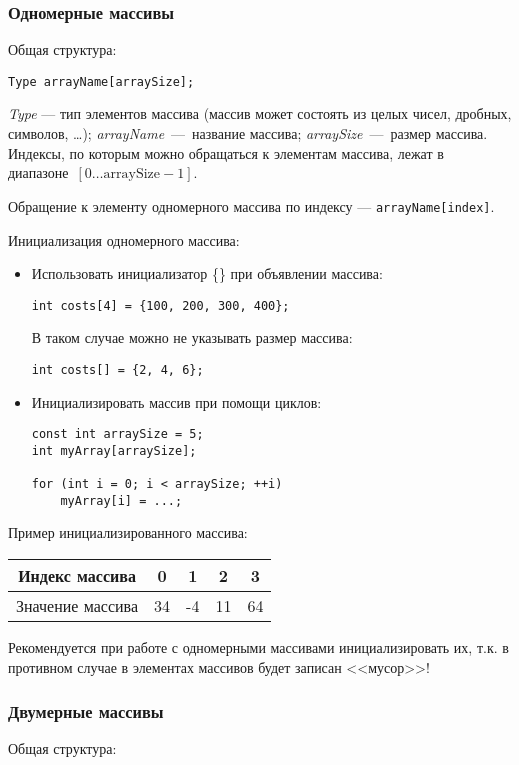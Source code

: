 \subsubsection{Одномерные массивы}
Общая структура:

\lstinline|Type arrayName[arraySize];|

\textit{Type} --- тип элементов массива
(массив может состоять из целых чисел, дробных, символов, \ldots);
\textit{arrayName}~---~название массива; \textit{arraySize}~---~размер
массива. Индексы, по которым можно обращаться к элементам массива,
лежат в диапазоне~$\left[ 0 \ldots \text{arraySize} - 1 \right]$.

Обращение к элементу одномерного массива по индексу --- \texttt{arrayName[index]}.

Инициализация одномерного массива:
\begin{itemize}
    \item Использовать инициализатор \{\} при объявлении массива:

    \lstinline|int costs[4] = {100, 200, 300, 400};|

    В таком случае можно не указывать размер массива:
    
    \lstinline|int costs[] = {2, 4, 6};|
    
    \item Инициализировать массив при помощи циклов:
    \begin{lstlisting}
const int arraySize = 5;
int myArray[arraySize];

for (int i = 0; i < arraySize; ++i)
    myArray[i] = ...;
    \end{lstlisting}
\end{itemize}

Пример инициализированного массива:

\begin{table}[h]
    \begin{tabular}{|c|c|c|c|c|}
      \hline
      Индекс массива & 0 & 1 & 2 & 3 \\
      \hline
      Значение массива & 34 & -4 & 11 & 64 \\
      \hline
    \end{tabular}
\end{table}

Рекомендуется при работе с одномерными массивами инициализировать их, т.к. в противном случае в элементах массивов будет записан <<мусор>>!

\subsubsection{Двумерные массивы}
Общая структура:

